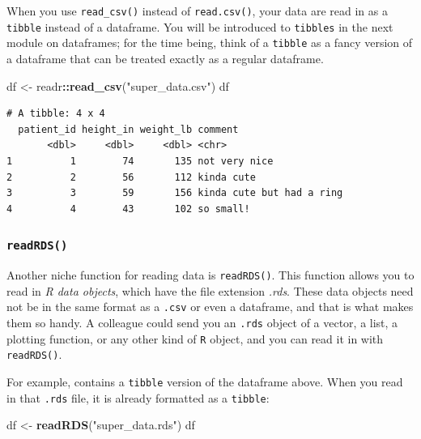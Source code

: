 \documentclass[
]{book}
\newenvironment{Shaded}{\begin{snugshade}}{\end{snugshade}}
\newcommand{\KeywordTok}[1]{\textcolor[rgb]{0.13,0.29,0.53}{\textbf{#1}}}
\newcommand{\NormalTok}[1]{#1}
\newcommand{\OperatorTok}[1]{\textcolor[rgb]{0.81,0.36,0.00}{\textbf{#1}}}
\newcommand{\StringTok}[1]{\textcolor[rgb]{0.31,0.60,0.02}{#1}}
\begin{document}
When you use \texttt{read\_csv()} instead of \texttt{read.csv()}, your data are read in as a \texttt{tibble} instead of a dataframe. You will be introduced to \texttt{tibbles} in the next module on dataframes; for the time being, think of a \texttt{tibble} as a fancy version of a dataframe that can be treated exactly as a regular dataframe.

\begin{Shaded}
\begin{Highlighting}[]
\NormalTok{df <-}\StringTok{ }\NormalTok{readr}\OperatorTok{::}\KeywordTok{read_csv}\NormalTok{(}\StringTok{"super_data.csv"}\NormalTok{)}
\NormalTok{df}
\end{Highlighting}
\end{Shaded}

\begin{verbatim}
# A tibble: 4 x 4
  patient_id height_in weight_lb comment                  
       <dbl>     <dbl>     <dbl> <chr>                    
1          1        74       135 not very nice            
2          2        56       112 kinda cute               
3          3        59       156 kinda cute but had a ring
4          4        43       102 so small!                
\end{verbatim}

\hypertarget{readrds}{%
\subsubsection*{\texorpdfstring{\texttt{readRDS()}}{readRDS()}}\label{readrds}}

Another niche function for reading data is \texttt{readRDS()}. This function allows you to read in \emph{R data objects}, which have the file extension \emph{.rds}. These data objects need not be in the same format as a \texttt{.csv} or even a dataframe, and that is what makes them so handy. A colleague could send you an \texttt{.rds} object of a vector, a list, a plotting function, or any other kind of \texttt{R} object, and you can read it in with \texttt{readRDS()}.

For example, contains a \texttt{tibble} version of the dataframe above. When you read in that \texttt{.rds} file, it is already formatted as a \texttt{tibble}:

\begin{Shaded}
\begin{Highlighting}[]
\NormalTok{df <-}\StringTok{ }\KeywordTok{readRDS}\NormalTok{(}\StringTok{"super_data.rds"}\NormalTok{)}
\NormalTok{df}
\end{Highlighting}
\end{Shaded}
\end{document}
